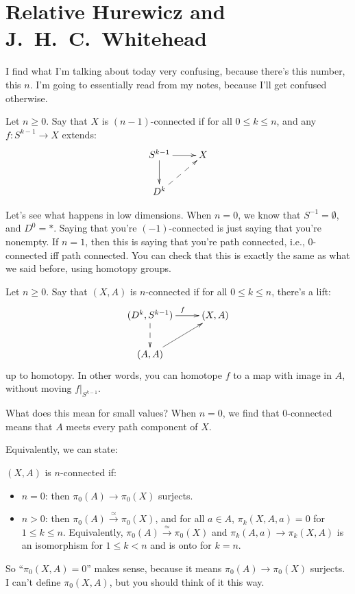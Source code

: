 \chapter{Relative Hurewicz and J.~H.~C.~Whitehead}
I find what I'm talking about today very confusing, because there's this number, this $n$. I'm going to essentially read from my notes, because I'll get confused otherwise.
\begin{definition}
    Let $n\geq 0$. Say that $X$ is $(n-1)$-connected if for all $0\leq k\leq n$, and any $f:S^{k-1}\to X$ extends:
    \begin{equation*}
	\xymatrix{
	S^{k-1}\ar[d]\ar[r] & X\\
	D^k\ar@{-->}[ur] & 
	}
    \end{equation*}
\end{definition}
    Let's see what happens in low dimensions. When $n=0$, we know that $S^{-1} = \emptyset$, and $D^0 = \ast$. Saying that you're $(-1)$-connected is just saying that you're nonempty. If $n=1$, then this is saying that you're path connected, i.e., $0$-connected iff path connected. You can check that this is exactly the same as what we said before, using homotopy groups.

\begin{definition}
    Let $n\geq 0$. Say that $(X,A)$ is $n$-connected if for all $0\leq k\leq n$, there's a lift:
    \begin{equation*}
	\xymatrix{
	    (D^k,S^{k-1})\ar[r]^f\ar@{-->}[d] & (X,A)\\
	    (A,A)\ar[ur] & 
	    }
    \end{equation*}
    up to homotopy. In other words, you can homotope $f$ to a map with image in $A$, without moving $f|_{S^{k-1}}$.
\end{definition}
What does this mean for small values? When $n=0$, we find that $0$-connected means that $A$ meets every path component of $X$.

Equivalently, we can state:
    \begin{definition}
	$(X,A)$ is $n$-connected if:
	\begin{itemize}
	    \item $n=0$: then $\pi_0(A)\to \pi_0(X)$ surjects.
	    \item $n>0$: then $\pi_0(A)\xrightarrow{\simeq}\pi_0(X)$, and for all $a\in A$, $\pi_k(X,A,a) = 0$ for $1\leq k\leq n$. Equivalently, $\pi_0(A)\xrightarrow{\simeq}\pi_0(X)$ and $\pi_k(A,a)\to\pi_k(X,A)$ is an isomorphism for $1\leq k<n$ and is onto for $k=n$.
	\end{itemize}
    \end{definition}
    So ``$\pi_0(X,A) = 0$'' makes sense, because it means $\pi_0(A)\to \pi_0(X)$ surjects. I can't define $\pi_0(X,A)$, but you should think of it this way.

